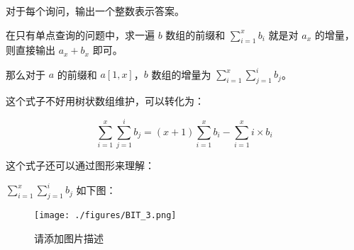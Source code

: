 对于每个询问，输出一个整数表示答案。

在只有单点查询的问题中，求一遍 $b$ 数组的前缀和 $\sum\limits^x_{i=1}b_i$ 就是对 $a_x$ 的增量，则直接输出 $a_x + b_x$ 即可。

那么对于 $a$ 的前缀和 $a[1, x]$，$b$ 数组的增量为 $\sum\limits^x_{i=1}\sum\limits^i_{j=1}b_j$。

这个式子不好用树状数组维护，可以转化为：

\begin{equation}
\sum\limits^x_{i=1}\sum\limits^i_{j=1}b_j = (x + 1)\sum\limits^x_{i=1}b_i - \sum\limits^x_{i=1}i \times b_i
\end{equation}

这个式子还可以通过图形来理解：

$\sum\limits^x_{i=1}\sum\limits^i_{j=1}b_j$ 如下图：

\begin{figure}[ht]
\centering
\texttt{[image: ./figures/BIT\_3.png]}
\caption{请添加图片描述} \label{BIT_fig3}
\end{figure}